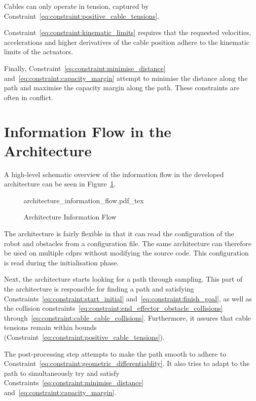 	Cables can only operate in tension, captured by
	Constraint~\ref{eq:constraint:positive_cable_tensions}.

	Constraint~\ref{eq:constraint:kinematic_limits} requires that the requested
	velocities, accelerations and higher derivatives of the cable position
	adhere to the kinematic limits of the actuators.

	Finally, Constraint~\ref{eq:constraint:minimise_distance}
	and~\ref{eq:constraint:capacity_margin} attempt to minimise the distance
	along the path and maximise the capacity margin along the path. These
	constraints are often in conflict.

	\section{Information Flow in the Architecture}

		A high-level schematic overview of the information flow in the developed
		architecture can be seen in
		Figure~\ref{fig:architecture_information_flow}.

		\begin{figure}[hbt]
			\centering
			\def\svgwidth{\columnwidth}
			{architecture_information_flow.pdf_tex}
			\caption{Architecture Information Flow}
			\label{fig:architecture_information_flow}
		\end{figure}

		The architecture is fairly flexible in that it can read the
		configuration of the robot and obstacles from a configuration file. The
		same architecture can therefore be used on multiple \glspl{cdpr} without
		modifying the source code. This configuration is read during the
		initialisation phase.

		Next, the architecture starts looking for a path through sampling. This
		part of the architecture is responsible for finding a path and
		satisfying Constraints~\ref{eq:constraint:start_initial}
		and~\ref{eq:constraint:finish_goal}, as well as the collision
		constraints~\ref{eq:constraint:end_effector_obstacle_collisions}
		through~\ref{eq:constraint:cable_cable_collisions}. Furthermore, it
		assures that cable tensions remain within bounds
		(Constraint~\ref{eq:constraint:positive_cable_tensions}).

		The post-processing step attempts to make the path smooth to adhere to
		Constraint~\ref{eq:constraint:geometric_differentiablity}. It also tries
		to adapt to the path to simultaneously try and satisfy
		Constraints~\ref{eq:constraint:minimise_distance}
		and~\ref{eq:constraint:capacity_margin}.

